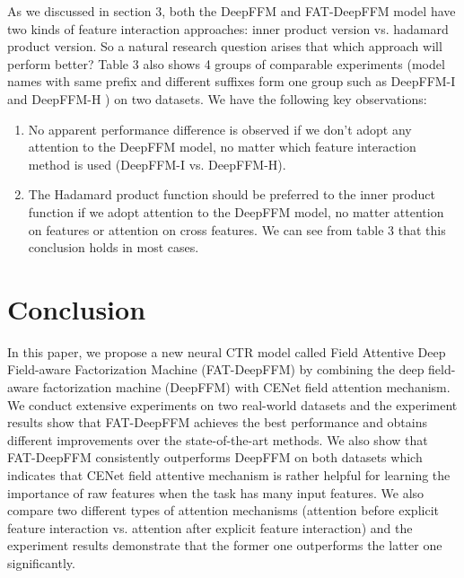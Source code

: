 \documentclass{article}
\begin{document}
As we discussed in section 3, both the DeepFFM and FAT-DeepFFM model have two kinds of feature interaction approaches: inner product version vs. hadamard product version. So a natural research question arises that which approach will perform better? Table 3 also shows 4 groups of comparable experiments (model names with same prefix and different suffixes form one group such as DeepFFM-I and DeepFFM-H ) on two datasets. We have the following key observations:
\begin{enumerate}
    \item No apparent performance difference is observed if we don't adopt any attention to the DeepFFM model, no matter which feature interaction method is used (DeepFFM-I vs. DeepFFM-H).
    \item The Hadamard product function should be preferred to the inner product function if we adopt attention to the DeepFFM model, no matter attention on features or attention on cross features. We can see from table 3 that this conclusion holds in most cases.
\end{enumerate}

\section{Conclusion}
In this paper, we propose a new neural CTR model called Field Attentive Deep Field-aware Factorization Machine (FAT-DeepFFM) by combining the deep field-aware factorization machine (DeepFFM) with CENet field attention mechanism. We conduct extensive experiments on two real-world datasets and the experiment results show that FAT-DeepFFM achieves the best performance and obtains different improvements over the state-of-the-art methods. We also show that FAT-DeepFFM consistently outperforms DeepFFM on both datasets which indicates that CENet field attentive mechanism is rather helpful for learning the importance of raw features when the task has many input features. We also compare two different types of attention mechanisms (attention before explicit feature interaction vs. attention after explicit feature interaction) and the experiment results demonstrate that the former one outperforms the latter one significantly.



\end{document}
